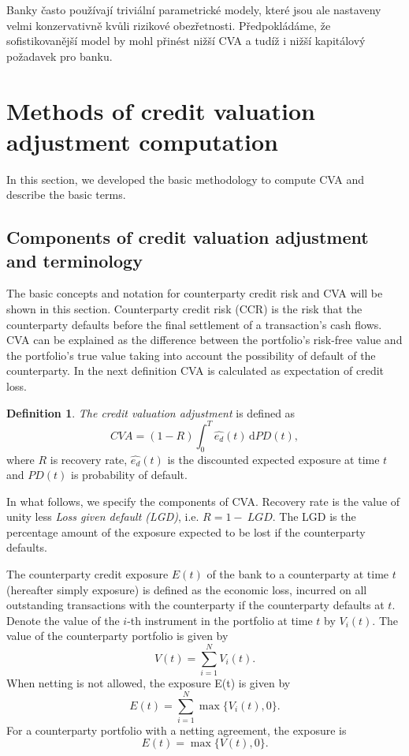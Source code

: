 \documentclass{amsart}
\theoremstyle{definition}\newtheorem{definition}[theorem]{Definition}
\theoremstyle{remark}\newtheorem{remark}[theorem]{Remark}
\newcommand{\dif}{\,\mathrm{d}}
\begin{document}
Banky často používají triviální parametrické modely, které jsou ale nastaveny velmi konzervativně kvůli rizikové obezřetnosti.
Předpokládáme, že sofistikovanější model by mohl přinést nižší CVA a tudíž i nižší kapitálový požadavek pro banku. 


\section{Methods of credit valuation adjustment computation} 
In this section, we developed the basic methodology to compute CVA and describe the basic terms.

\subsection{Components of credit valuation adjustment and terminology}
The basic concepts and notation for counterparty credit risk and CVA will be shown in this section.
Counterparty credit risk (CCR) is the risk that the counterparty defaults before the final settlement of a transaction's cash flows.
CVA can be explained as the difference between the portfolio's risk-free value and the portfolio's true value taking into account the possibility of default of the counterparty.
In the next definition CVA is calculated as expectation of credit loss.
\begin{definition}
 \textit{The credit valuation adjustment} is defined as
 \begin{equation}
 CVA=(1-R)\int_{0}^T \hat{e_d}(t)\dif PD(t),
 \label{CVA}
\end{equation}
  where $R$ is recovery rate, $\hat{e_d}(t)$ is the discounted expected exposure at time $t$ and $PD(t)$ is probability of default.
\end{definition}
In what follows, we specify the components of CVA. 
Recovery rate is the value of unity less \textit{Loss given default (LGD)}, i.e. $R=1-~LGD$.
The LGD is the percentage amount of the exposure expected to be lost if the counterparty defaults.

The counterparty credit exposure $E(t)$ of the bank to a counterparty at time $t$ (hereafter simply exposure) is defined as the economic loss, incurred on all outstanding transactions with the counterparty if the counterparty defaults at $t$.
Denote the value of the $i$-th instrument in the portfolio at time $t$ by  $V_i(t)$. 
The value of the counterparty portfolio is given by 
\begin{equation}
V(t)=\sum_{i=1}^N V_i(t).
\end{equation}
When netting is not allowed, the exposure E(t) is given by
\begin{equation}
E(t)=\sum_{i=1}^N\max\{V_i(t),0\}.
\end{equation}
For a counterparty portfolio with a netting agreement, the exposure is
\begin{equation}
E(t)=\max\{V(t),0\}.
\label{totalExposure}
\end{equation}
\end{document}
